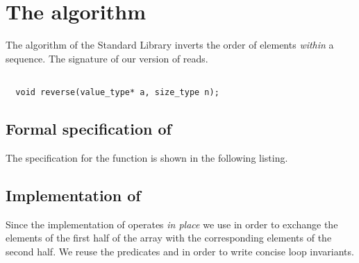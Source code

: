 
\section{The \reverse algorithm}

The \reverse algorithm of the \cxx Standard Library
\cite[\S 28.6.10]{cxx-17-draft} inverts the order of elements \emph{within} a sequence.
The signature of our version of \reverse reads.

\begin{lstlisting}[style=acsl-block]

  void reverse(value_type* a, size_type n);
\end{lstlisting}


\subsection{Formal specification of \reverse}

The specification for the  function is shown in the following listing.



\subsection{Implementation of \reverse}

Since the implementation of  operates \emph{in place}
we use  in order to exchange the elements of the first half
of the array with the corresponding elements of the second half.
We reuse the predicates  and 
in order to write concise loop invariants.



